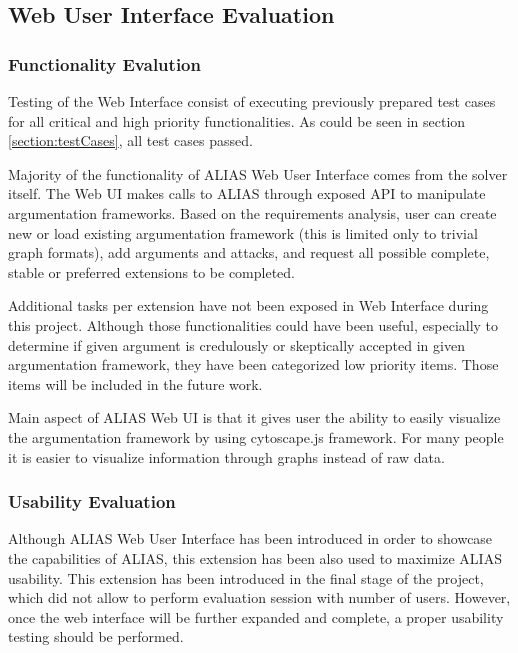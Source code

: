 \subsection{Web User Interface Evaluation}


\subsubsection{Functionality Evalution}
Testing of the Web Interface consist of executing previously prepared test cases for all critical and high priority functionalities. As could be seen in section \ref{section:testCases}, all test cases passed.

Majority of the functionality of ALIAS Web User Interface comes from the solver itself. The Web UI makes calls to ALIAS through exposed API to manipulate argumentation frameworks. Based on the requirements analysis, user can create new or load existing argumentation framework (this is limited only to trivial graph formats), add arguments and attacks, and request all possible complete, stable or preferred extensions to be completed. 

Additional tasks per extension have not been exposed in Web Interface during this project. Although those functionalities could have been useful, especially to determine if given argument is credulously or skeptically accepted in given argumentation framework, they have been categorized low priority items. Those items will be included in the future work.

Main aspect of ALIAS Web UI is that it gives user the ability to easily visualize the argumentation framework by using cytoscape.js framework. For many people it is easier to visualize information through graphs instead of raw data. 

\subsubsection{Usability Evaluation}
Although ALIAS Web User Interface has been introduced in order to showcase the capabilities of ALIAS, this extension has been also used to maximize ALIAS usability. This extension has been introduced in the final stage of the project, which did not allow to perform evaluation session with number of users. However, once the web interface will be further expanded and complete, a proper usability testing should be performed.